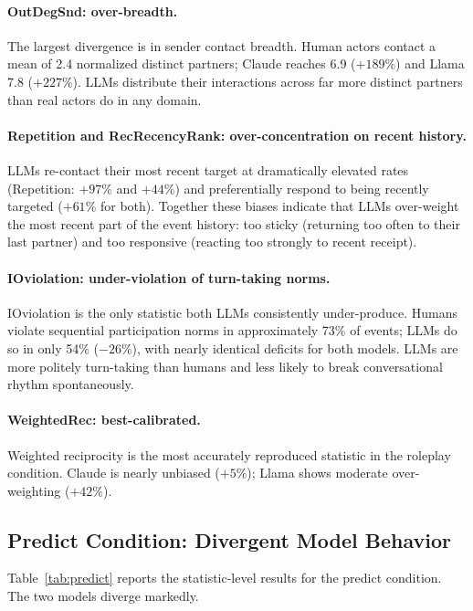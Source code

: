 \documentclass[11pt]{article}
\begin{document}
\paragraph{OutDegSnd: over-breadth.}
The largest divergence is in sender contact breadth. Human actors contact
a mean of 2.4 normalized distinct partners; Claude reaches 6.9 ($+189\%$)
and Llama 7.8 ($+227\%$). LLMs distribute their interactions across far
more distinct partners than real actors do in any domain.

\paragraph{Repetition and RecRecencyRank: over-concentration on recent history.}
LLMs re-contact their most recent target at dramatically elevated rates
(Repetition: $+97\%$ and $+44\%$) and preferentially respond to being
recently targeted ($+61\%$ for both). Together these biases indicate that
LLMs over-weight the most recent part of the event history: too sticky
(returning too often to their last partner) and too responsive (reacting
too strongly to recent receipt).

\paragraph{IOviolation: under-violation of turn-taking norms.}
IOviolation is the only statistic both LLMs consistently under-produce.
Humans violate sequential participation norms in approximately 73\% of events;
LLMs do so in only 54\% ($-26\%$), with nearly identical deficits for both
models. LLMs are more politely turn-taking than humans and less likely to
break conversational rhythm spontaneously.

\paragraph{WeightedRec: best-calibrated.}
Weighted reciprocity is the most accurately reproduced statistic in the
roleplay condition. Claude is nearly unbiased ($+5\%$); Llama shows
moderate over-weighting ($+42\%$).

\subsection{Predict Condition: Divergent Model Behavior}

Table~\ref{tab:predict} reports the statistic-level results for the predict
condition. The two models diverge markedly.
\end{document}

